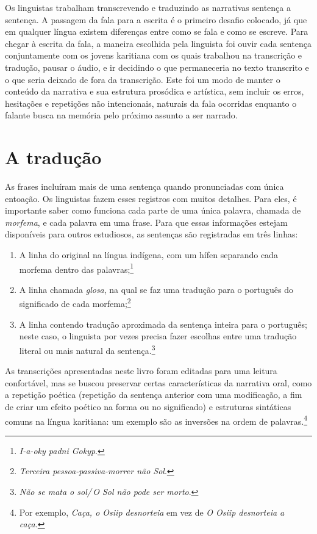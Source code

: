 Os linguistas trabalham transcrevendo e traduzindo as narrativas
sentença a sentença. A passagem da fala para a escrita é o primeiro
desafio colocado, já que em qualquer língua existem diferenças entre
como se fala e como se escreve. Para chegar à escrita da fala, a maneira
escolhida pela linguista foi ouvir cada sentença conjuntamente com os
jovens karitiana com os quais trabalhou na transcrição e tradução,
pausar o áudio, e ir decidindo o que permaneceria no texto transcrito e
o que seria deixado de fora da transcrição. Este foi um modo de manter o
conteúdo da narrativa e sua estrutura prosódica e artística, sem incluir
os erros, hesitações e repetições não intencionais, naturais da fala
ocorridas enquanto o falante busca na memória pelo próximo assunto a ser
narrado.

\section{A tradução}

As frases incluíram mais de uma sentença quando pronunciadas com única entoação. Os linguistas fazem esses
registros com muitos detalhes. Para eles, é importante saber como
funciona cada parte de uma única palavra, chamada de \textit{morfema}, e
cada palavra em uma frase. Para que essas informações estejam
disponíveis para outros estudiosos, as sentenças são registradas em três
linhas: 

\begin{enumerate}
\item A linha do original na língua indígena, com um hífen
separando cada morfema dentro das palavras;\footnote{\textit{I-a-oky padni Gokyp}.}

\item A linha chamada
\textit{glosa}, na qual se faz uma tradução para o português do
significado de cada morfema;\footnote{\textit{Terceira pessoa-passiva-morrer não Sol}.}

\item A linha contendo tradução
aproximada da sentença inteira para o português; neste caso, o linguista
por vezes precisa fazer escolhas entre uma tradução literal ou mais natural da sentença.\footnote{\textit{Não se mata o sol/\,O Sol não pode ser morto}.}

\end{enumerate}

As transcrições apresentadas neste livro foram editadas para uma leitura
confortável, mas se buscou preservar certas características da narrativa
oral, como a repetição poética (repetição da sentença anterior com uma
modificação, a fim de criar um efeito poético na forma ou no
significado) e estruturas sintáticas comuns na língua karitiana: um
exemplo são as inversões na ordem de palavras.\footnote{Por exemplo, \textit{Caça, o
Osiip desnorteia} em vez de \textit{O Osiip desnorteia a caça.}}

